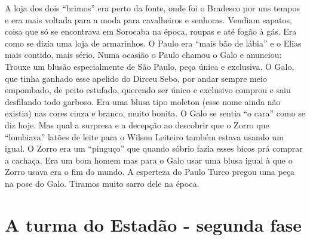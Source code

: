 \documentclass[12pt,brazil,]{book}
\begin{document}
A loja dos dois ``brimos'' era perto da fonte, onde foi o Bradesco por
uns tempos e era mais voltada para a moda para cavalheiros e senhoras.
Vendiam sapatos, coisa que só se encontrava em Sorocaba na época, roupas
e até fogão à gás. Era como se dizia uma loja de armarinhos. O Paulo era
``mais bão de lábia'' e o Elias mais contido, mais sério. Numa ocasião o
Paulo chamou o Galo e anunciou: Trouxe um blusão especialmente de São
Paulo, peça única e exclusiva. O Galo, que tinha ganhado esse apelido do
Dirceu Sebo, por andar sempre meio empombado, de peito estufado,
querendo ser único e exclusivo comprou e saiu desfilando todo garboso.
Era uma blusa tipo moleton (esse nome ainda não existia) nas cores cinza
e branco, muito bonita. O Galo se sentia ``o cara'' como se diz hoje.
Mas qual a surpresa e a decepção ao descobrir que o Zorro que
``lombiava'' latões de leite para o Wilson Leiteiro também estava usando
um igual. O Zorro era um ``pinguço'' que quando sóbrio fazia esses bicos
prá comprar a cachaça. Era um bom homem mas para o Galo usar uma blusa
igual à que o Zorro usava era o fim do mundo. A esperteza do Paulo Turco
pregou uma peça na pose do Galo. Tiramos muito sarro dele na época.

\section{A turma do Estadão - segunda
fase}\label{a-turma-do-estaduxe3o---segunda-fase}
\end{document}
